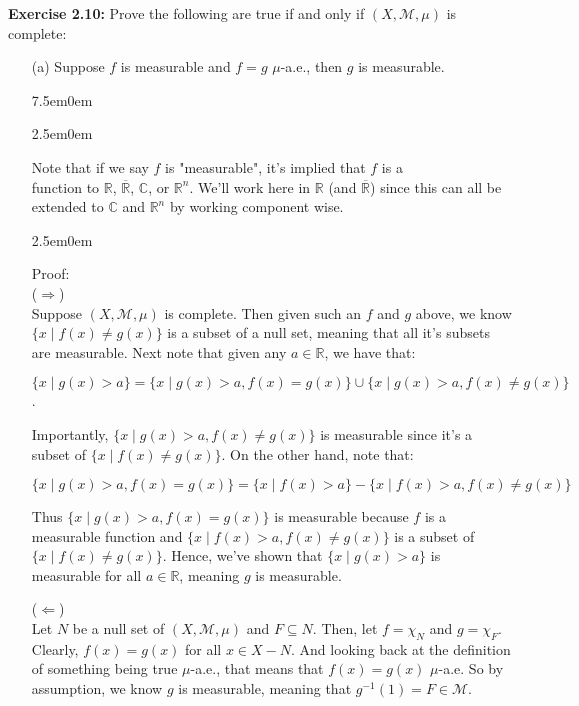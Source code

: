 \documentclass{book}
\newcommand{\myComment}{%
   \color{RawerSienna}%
   \fontsize{12}{14}\selectfont%
}
\newcommand{\exOne}{%
   \color{Purple}%
   \fontsize{13}{15}\selectfont%
}
\newcommand{\exTwoP}{%
   \color{RedViolet}%
   \fontsize{13}{15}\selectfont%
}
\newcommand{\exPP}{%
   \color{RedViolet}%
   \fontsize{12}{14}\selectfont%
}
\newenvironment{myIndent}{%
   \begin{adjustwidth}{2.5em}{0em}%
}{%
   \end{adjustwidth}%
}
\newenvironment{myTindent}{%
   \begin{adjustwidth}{7.5em}{0em}%
}{%
   \end{adjustwidth}%
}
\newcommand{\blab}[1]{\textbf{#1}}
\newcommand{\retTwo}{\hfill\bigbreak}
\begin{document}
\exOne\blab{Exercise 2.10:} Prove the following are true if and only if $(X, \mathcal{M}, \mu)$ is complete:
\begin{enumerate}
   \item[(a)] Suppose $f$ is measurable and $f = g$ $\mu$-a.e., then $g$ is measurable.
   
   \begin{myTindent}\begin{myIndent}\myComment
      Note that if we say $f$ is "measurable", it's implied that $f$ is a\\ function to $\mathbb{R}$, $\overline{\mathbb{R}}$, $\mathbb{C}$, or $\mathbb{R}^n$. We'll work here in $\mathbb{R}$ (and $\overline{\mathbb{R}}$) since this can all be extended to $\mathbb{C}$ and $\mathbb{R}^n$ by working component wise.
   \end{myIndent}\end{myTindent}
   
   \begin{myIndent}\exTwoP
      Proof:\\
      ($\Longrightarrow$)\\
      Suppose $(X, \mathcal{M}, \mu)$ is complete. Then given such an $f$ and $g$ above, we know $\{x \mid f(x) \neq g(x)\}$ is a subset of a null set, meaning that all it's subsets are measurable. Next note that given any $a \in \mathbb{R}$, we have that:

      {\centering\exPP $\{x \mid g(x) > a\} = \{x \mid g(x) > a, f(x) = g(x)\} \cup \{x \mid g(x) > a, f(x) \neq g(x)\}$. \retTwo\par}

      Importantly, $\{x \mid g(x) > a, f(x) \neq g(x)\}$ is measurable since it's a subset of $\{x \mid f(x) \neq g(x)\}$. On the other hand, note that:
      
      {\centering\exPP $\{x \mid g(x) > a, f(x) = g(x)\} = \{x \mid f(x) > a\} - \{x \mid f(x) > a, f(x) \neq g(x)\}$ \retTwo\par}
      
      Thus $\{x \mid g(x) > a, f(x) = g(x)\}$ is measurable because $f$ is a measurable function and $\{x \mid f(x) > a, f(x) \neq g(x)\}$ is a subset of $\{x \mid f(x) \neq g(x)\}$. Hence, we've shown that $\{x \mid g(x) > a\}$ is measurable for all $a \in \mathbb{R}$, meaning $g$ is measurable.\retTwo

      ($\Longleftarrow$)\\
      Let $N$ be a null set of $(X, \mathcal{M}, \mu)$ and $F \subseteq N$. Then, let $f = \chi_{N}$ and $g = \chi_F$. Clearly, $f(x) = g(x)$ for all $x \in X - N$. And looking back at the definition of something being true $\mu$-a.e., that means that $f(x) = g(x)$ $\mu$-a.e. So by assumption, we know $g$ is measurable, meaning that $g^{-1}(1) = F \in \mathcal{M}$. 
   \end{myIndent}


\end{enumerate}
\end{document}
